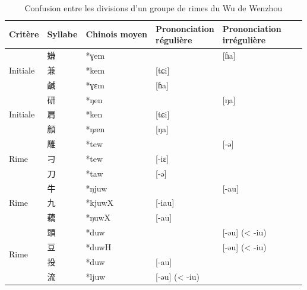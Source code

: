 \documentclass{scrbook}
\newcounter{c}[subsubsection]
\begin{document}
\begin{sloppypar}
\begin{table}[htbp]
  \centering
    \begin{tabular}{lllllll}
    \toprule
    Critère & Syllabe & Chinois moyen  & \makecell{Prononciation\\ régulière} & \makecell{Prononciation\\ irrégulière} \\
    \midrule
    \multirow{3}[2]{*}{Initiale} & \cellcolor[rgb]{ .851,  .851,  .851}嫌 & *ɣem  &       & \multicolumn{1}{l}{[ɦa]} \\
          & 兼     & *kem  & [tɕi] &  \\
          & \cellcolor[rgb]{ .851,  .851,  .851}鹹 & *ɣɛm  & [ɦa]  &  \\
    \midrule
    \multirow{3}[2]{*}{Initiale} & \cellcolor[rgb]{ .851,  .851,  .851}研 & *ŋen  &       & \multicolumn{1}{l}{[ŋa]} \\
          & 肩     & *ken  & [tɕi] &  \\
          & \cellcolor[rgb]{ .851,  .851,  .851}顏 & *ŋæn  & [ŋa]  &  \\
    \midrule
    \multirow{3}[2]{*}{Rime} & \cellcolor[rgb]{ .851,  .851,  .851}雕 & *tew  &       & \multicolumn{1}{l}{[-ə]} \\
          & 刁     & *tew  & [-iɛ] &  \\
          & \cellcolor[rgb]{ .851,  .851,  .851}刀 & *taw  & [-ə]  &  \\
    \midrule
    \multirow{3}[2]{*}{Rime} & \cellcolor[rgb]{ .851,  .851,  .851}牛 & *ŋjuw &       & \multicolumn{1}{l}{[-au]} \\
          & 九     & *kjuwX & [-iau] &  \\
          & \cellcolor[rgb]{ .851,  .851,  .851}藕 & *ŋuwX & [-au] &  \\
    \midrule
    \multirow{4}[2]{*}{Rime} & \cellcolor[rgb]{ .851,  .851,  .851}頭 & *duw  &       & \multicolumn{1}{l}{[-əu] (< -iu)} \\
          & \cellcolor[rgb]{ .851,  .851,  .851}豆 & *duwH &       & \multicolumn{1}{l}{[-əu] (< -iu)} \\
          & 投     & *duw  & [-au] &  \\
          & \cellcolor[rgb]{ .851,  .851,  .851}流 & *ljuw & [-əu] (< -iu) &  \\
    \bottomrule
    \end{tabular}%
  \caption{Confusion entre les divisions d'un groupe de rimes du Wu de Wenzhou}
  \label{tab:exemple_confusion_division_wenzhou}%
\end{table}%


\end{sloppypar}
\end{document}
